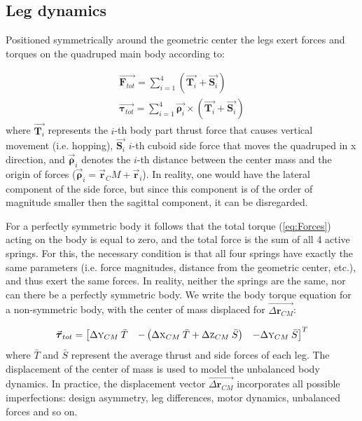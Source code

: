 \subsection{Leg dynamics}


Positioned symmetrically around the geometric center the legs exert forces and torques on the quadruped main body according to:

\begin{gather}\label{eq:Forces}
\vec{\textbf{F}_{tot}}=\sum_{i=1}^{4}(\vec{\textbf{T}_{i}}+\vec{\textbf{S}_{i}})\\
\vec{\boldsymbol{\tau}_{tot}}=\sum_{i=1}^{4}\vec{\boldsymbol{\rho} _i}\times(\vec{\textbf{T}_{i}}+\vec{\textbf{S}_{i}})
\end{gather}  
where $\vec{\textbf{T}_{i}}$ represents the $i$-th body part thrust force that causes vertical movement (i.e. hopping), $\vec{\textbf{S}_{i}}$ $i$-th cuboid side force that moves the quadruped in x direction, and $\vec{\boldsymbol{\rho}} _i$ denotes the $i$-th distance between the center mass and the origin of forces ($\vec{\boldsymbol{\rho}} _i=\vec{\textbf{r}} _CM+\vec{\textbf{r}} _i$). In reality, one would have the lateral component of the side force, but since this component is of the order of magnitude smaller then the sagittal component, it can be disregarded.

For a perfectly symmetric body it follows that the total torque (\ref{eq:Forces}) acting on the body is equal to zero, and the total force is the sum of all 4 active springs. For this, the necessary condition is that all four springs have exactly the same parameters (i.e. force magnitudes, distance from the geometric center, etc.), and thus exert the same forces. In reality, neither the springs are the same, nor can there be a perfectly symmetric body. We write the body torque equation for a non-symmetric body, with the center of mass displaced for $\vec{\Delta\textbf{r}_{CM}}$:

\begin{equation}\label{eq:Torques}
\vec{\boldsymbol{\tau}}_{tot}=\begin{bmatrix}
\Delta \textsc{y}_{CM} \:\bar{T} & -\left ( \Delta \textsc{x}_{CM} \:\bar{T} +\Delta \textsc{z}_{CM} \:\bar{S}\right ) & -\Delta \textsc{y}_{CM} \:\bar{S}
\end{bmatrix}^T
\end{equation}
where $\bar{T}$ and $\bar{S}$ represent the average thrust and side forces of each leg. The displacement of the center of mass is used to model the unbalanced body dynamics. In practice, the displacement vector  $\vec{\Delta\textbf{r}_{CM}}$ incorporates all possible imperfections: design asymmetry, leg differences, motor dynamics, unbalanced  forces and so on.

